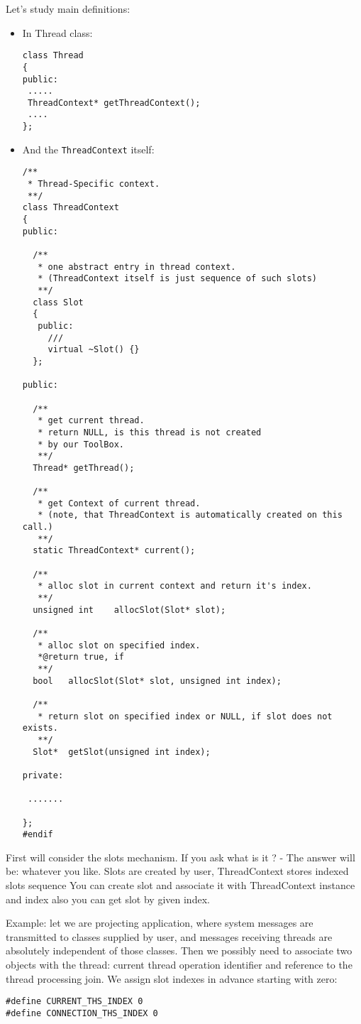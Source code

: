 \documentclass[10pt]{article}
\begin{document}
Let's study main definitions:
\begin{itemize} 
 \item In Thread class:
\begin{verbatim}
class Thread
{
public:
 .....
 ThreadContext* getThreadContext();
 ....
};
\end{verbatim}
 \item And the \verb|ThreadContext| itself:
\begin{verbatim}
/**
 * Thread-Specific context.
 **/
class ThreadContext
{
public:

  /**
   * one abstract entry in thread context.
   * (ThreadContext itself is just sequence of such slots)
   **/
  class Slot
  {
   public:
     ///
     virtual ~Slot() {}
  };

public:

  /**
   * get current thread.
   * return NULL, is this thread is not created
   * by our ToolBox.
   **/
  Thread* getThread();

  /**
   * get Context of current thread.
   * (note, that ThreadContext is automatically created on this call.)
   **/
  static ThreadContext* current();

  /**
   * alloc slot in current context and return it's index.
   **/
  unsigned int    allocSlot(Slot* slot);

  /**
   * alloc slot on specified index.
   *@return true, if
   **/
  bool   allocSlot(Slot* slot, unsigned int index);

  /**
   * return slot on specified index or NULL, if slot does not exists.
   **/
  Slot*  getSlot(unsigned int index);

private:

 .......

};
#endif
\end{verbatim}
\end{itemize}

 First will consider the slots mechanism.
 If you ask what is it ? - The answer will be: whatever you like.
 Slots are created by user, ThreadContext stores indexed slots sequence 
 You can create slot and associate it with  ThreadContext instance and index 
 also you can get slot by given index.

 Example: let we are projecting application, where system messages are  transmitted 
 to classes supplied by user, and messages receiving threads are absolutely independent 
 of those classes. Then we possibly need to associate two objects with the thread:  
 current thread operation identifier and reference to the thread processing join.  
 We assign slot indexes in advance starting with zero:
\begin{verbatim}
#define CURRENT_THS_INDEX 0
#define CONNECTION_THS_INDEX 0
\end{verbatim}
\end{document}
